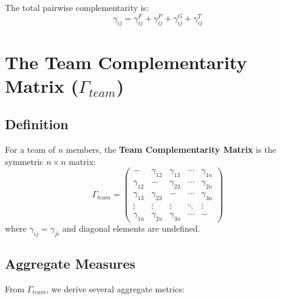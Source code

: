 The total pairwise complementarity is:
\begin{equation}
\gamma_{ij} = \gamma^{F}_{ij} + \gamma^{P}_{ij} + \gamma^{G}_{ij} + \gamma^{T}_{ij}
\end{equation}



\section{The Team Complementarity Matrix ($\Gamma_{team}$)}
\label{sec:bm-matrix}

\subsection{Definition}

\begin{definition}
For a team of $n$ members, the \textbf{Team Complementarity Matrix} is the
symmetric $n \times n$ matrix:
\begin{equation}
\Gamma_{team} = \begin{pmatrix}
- & \gamma_{12} & \gamma_{13} & \cdots & \gamma_{1n} \\
\gamma_{12} & - & \gamma_{23} & \cdots & \gamma_{2n} \\
\gamma_{13} & \gamma_{23} & - & \cdots & \gamma_{3n} \\
\vdots & \vdots & \vdots & \ddots & \vdots \\
\gamma_{1n} & \gamma_{2n} & \gamma_{3n} & \cdots & -
\end{pmatrix}
\end{equation}
where $\gamma_{ij} = \gamma_{ji}$ and diagonal elements are undefined.
\end{definition}

\subsection{Aggregate Measures}

From $\Gamma_{team}$, we derive several aggregate metrics:

